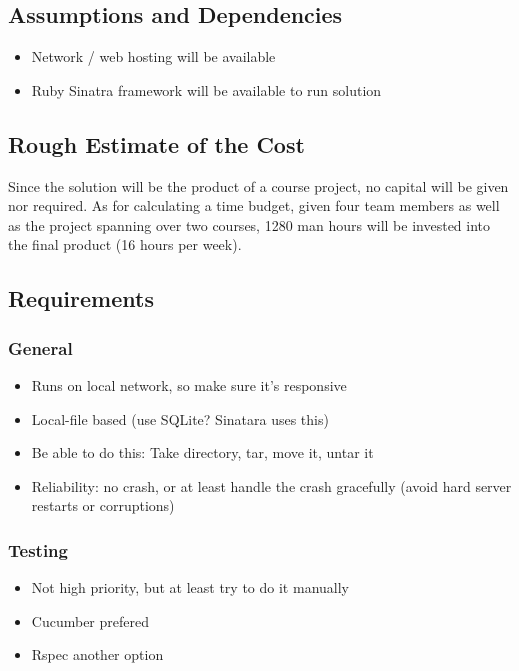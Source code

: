 \documentclass{article}
\begin{document}
\subsection{Assumptions and Dependencies}
\begin{itemize}
\item Network / web hosting will be available
\item Ruby Sinatra framework will be available to run solution
\end{itemize}

\subsection{Rough Estimate of the Cost}
Since the solution will be the product of a course project, no capital will be given nor required.  As for calculating a time budget, given four team members as well as the project spanning over two courses, 1280 man hours will be invested into the final product (16 hours per week).

\subsection{Requirements}
\subsubsection{General}
\begin{itemize}
\item Runs on local network, so make sure it's responsive
\item Local-file based (use SQLite? Sinatara uses this)
\item Be able to do this: Take directory, tar, move it, untar it
\item Reliability: no crash, or at least handle the crash gracefully (avoid hard server restarts or corruptions)
\end{itemize}

\subsubsection{Testing}
\begin{itemize}
\item Not high priority, but at least try to do it manually
\item Cucumber prefered
\item Rspec another option
\end{itemize}
\end{document}
